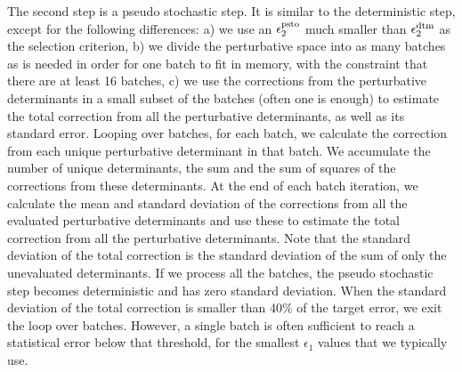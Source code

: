 \documentclass[%
preprint,
 superscriptaddress,
 amsmath,amssymb,
 aps,
]{revtex4-1}
\begin{document}
The second step is a pseudo stochastic step.
It is similar to the deterministic step, except for the following differences: 
a) we use an $\epsilon_2^{\rm psto}$ much smaller than $\epsilon_2^{\rm dtm}$ as the selection criterion,
b) we divide the perturbative space into as many batches as is needed in order for one batch to fit in memory,
with the constraint that there are at least 16 batches,
c) we use the corrections from the perturbative determinants in a small subset of the batches (often one is enough)
to estimate the total correction from all the perturbative determinants, as well as its standard error.
Looping over batches, for each batch, we calculate the correction from each unique perturbative determinant in that batch.
We accumulate the number of unique determinants, the sum and the sum of squares of the corrections from these determinants.
At the end of each batch iteration, we calculate the mean and standard deviation of the corrections from all the
evaluated perturbative determinants and use these to estimate the total correction from all the perturbative determinants.
Note that the standard deviation of the total correction is the standard deviation of the sum of only the unevaluated determinants.
If we process all the batches, the pseudo stochastic step becomes deterministic and has zero standard deviation.
When the standard deviation of the total correction is smaller than 40\% of the target error, we exit the loop over batches.
However, a single batch is often sufficient to reach a statistical error below that threshold,
for the smallest $\epsilon_1$ values that we typically use.
\end{document}
